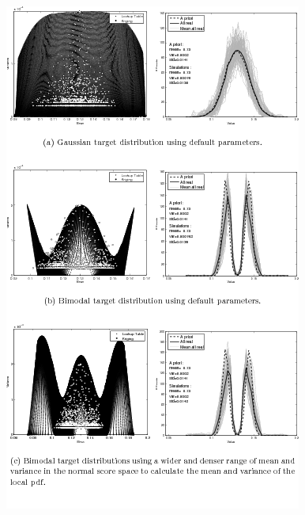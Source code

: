 \documentclass[12t]{article}
\begin{document}
\clearpage
\begin{figure}
  \centering
  \includegraphics{manfig_13}

  \caption[Left) Comparison of the the mean and variance of the local lookup table (black dots) compared to the actual kriging mean and variances (white dots).
Right) Histogram computed from 100 realizations compared to the target distribution and the mean of all 100 histograms.
]{}
\label{fig:dssim_covlookup_coverage}
\end{figure}
 
\end{document}
